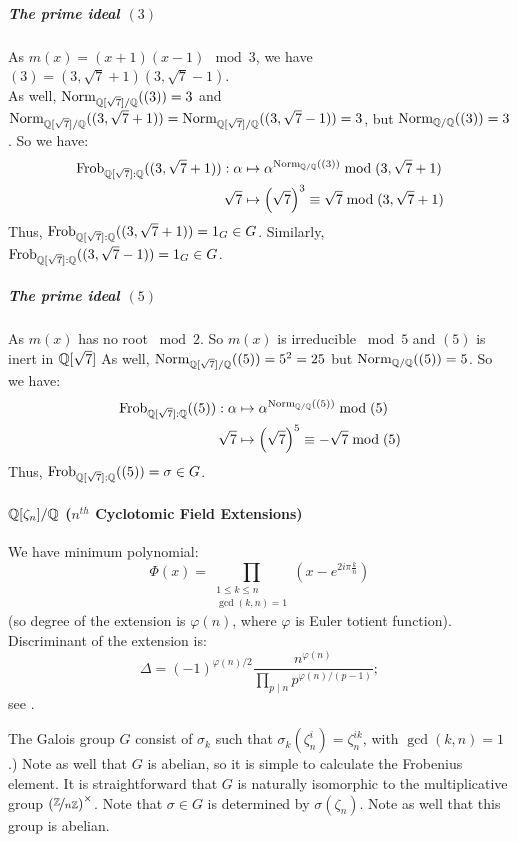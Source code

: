 \subparagraph{The prime ideal $(3)$}
As $m(x) = (x+1)(x-1) \mod 3$, we have $(3) = (3, \sqrt{7}+1)(3, \sqrt{7}-1)$.\\
As well, $\Norm[{\Q[\sqrt{7}]/\Q}]{(3)} = 3$ and $\Norm[{\Q[\sqrt{7}]/\Q}]{(3, \sqrt{7}+1)} 
=\Norm[{\Q[\sqrt{7}]/\Q}]{(3, \sqrt{7}-1)} 
= 3
$, but $\Norm[\Q/\Q]{(3)} = 3$.
So we have:
\begin{align*}
    \Frob{\Q[\sqrt{7}]:\Q}{(3, \sqrt{7}+1)}:
    \alpha   &\mapsto \alpha^{\Norm[\Q/\Q]{(3)}} \bmod (3, \sqrt{7}+1)\\
    \sqrt{7} &\mapsto \left( \sqrt{7} \right)^3 \equiv \sqrt{7} \bmod (3, \sqrt{7}+1)
\end{align*}
Thus, $\Frob{\Q[\sqrt{7}]:\Q}{(3, \sqrt{7}+1)} = 1_G \in G$.
Similarly, $\Frob{\Q[\sqrt{7}]:\Q}{(3, \sqrt{7}-1)} = 1_G \in G$.

\subparagraph{The prime ideal $(5)$}
As $m(x)$ has no root $\bmod 2$. So $m(x)$ is irreducible $\bmod 5$ and $(5)$ is inert in $\Q[\sqrt{7}]$
As well, $\Norm[{\Q[\sqrt{7}]/\Q}]{(5)} = 5^2 = 25$ but $\Norm[\Q/\Q]{(5)} = 5$.
So we have:
\begin{align*}
    \Frob{\Q[\sqrt{7}]:\Q}{(5)}: 
    \alpha   &\mapsto \alpha^{\Norm[\Q/\Q]{(5)}} \bmod (5)\\
    \sqrt{7} &\mapsto \left( \sqrt{7} \right)^5 \equiv -\sqrt{7} \bmod (5)
\end{align*}
Thus, $\Frob{\Q[\sqrt{7}]:\Q}{(5)} = \sigma \in G$.

\paragraph{$\Q[\zeta_n]/\Q$ ($n^{th}$ Cyclotomic Field Extensions)}
We have minimum polynomial:
$$
\Phi(x)= \prod_{\substack{1 \leq k \leq n \\ \gcd(k,n)=1}} 
\left( x-e^{2 i \pi \frac{k}{n}} \right)
$$
(so degree of the extension is $\varphi(n)$, where $\varphi$ is Euler totient function).
Discriminant of the extension is:
$$
\Delta = (-1)^{\varphi(n)/2}
\frac{n^{\varphi(n)}}{\prod_{p \mid n} p^{\varphi(n)/(p-1)}};
$$
see \cite[Proposition 2.7]{IntroductionToCyclotomicFields}.

The Galois group $G$ consist of $\sigma_k$ such that $\sigma_k(\zeta_n^i)=\zeta_n^{ik}$, with $\gcd(k,n)=1$.)
Note as well that $G$ is abelian, so it is simple to calculate the Frobenius element.
It is straightforward that $G$ is naturally isomorphic to the multiplicative group $\left( \nicefrac{\Z}{n\Z} \right)^\times$.
Note that $\sigma \in G$ is determined by $\sigma(\zeta_n)$.
Note as well that this group is abelian.

